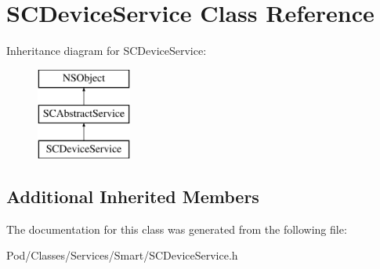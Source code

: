 \hypertarget{interface_s_c_device_service}{}\section{S\+C\+Device\+Service Class Reference}
\label{interface_s_c_device_service}
Inheritance diagram for S\+C\+Device\+Service\+:\begin{figure}[H]
\begin{center}
\leavevmode
\includegraphics[height=3.000000cm]{interface_s_c_device_service}
\end{center}
\end{figure}
\subsection*{Additional Inherited Members}


The documentation for this class was generated from the following file\+:\begin{DoxyCompactItemize}
\item 
Pod/\+Classes/\+Services/\+Smart/S\+C\+Device\+Service.\+h\end{DoxyCompactItemize}
